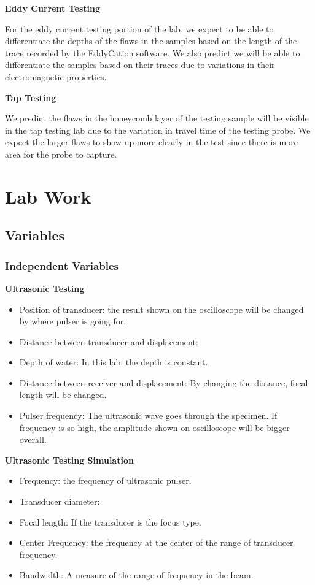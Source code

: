 \documentclass[12 pt]{report}
\begin{document}
\textbf{Eddy Current Testing}

For the eddy current testing portion of the lab, we expect to be able to differentiate the depths of the flaws in the samples based on the length of the trace recorded by the EddyCation software. We also predict we will be able to differentiate the samples based on their traces due to variations in their electromagnetic properties.

\textbf{Tap Testing}

We predict the flaws in the honeycomb layer of the testing sample will be visible in the tap testing lab due to the variation in travel time of the testing probe. We expect the larger flaws to show up more clearly in the test since there is more area for the probe to capture.

\chapter{Lab Work} \label{lab_work}
\section{Variables} \label{variables}
\subsection{Independent Variables} \label{variables-independent_variables}
\textbf{Ultrasonic Testing}

\begin{itemize}
	\item Position of transducer: the result shown on the oscilloscope will be changed by where pulser is going for.
	\item Distance between transducer and displacement:
	\item Depth of water: In this lab, the depth is constant.
	\item Distance between receiver and displacement: By changing the distance, focal length will be changed.
	\item Pulser frequency: The ultrasonic wave goes through the specimen. If frequency is so high, the amplitude shown on oscilloscope will be bigger overall.
\end{itemize}

\textbf{Ultrasonic Testing Simulation}

\begin{itemize}
	\item Frequency: the frequency of ultrasonic pulser.
	\item Transducer diameter:
	\item Focal length: If the transducer is the focus type.
	\item Center Frequency: the frequency at the center of the range of transducer frequency.
	\item Bandwidth: A measure of the range of frequency in the beam.
\end{itemize}
\end{document}
